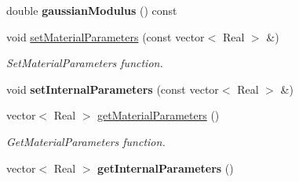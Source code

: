 \begin{DoxyCompactItemize}
\item 
\hypertarget{classvoom_1_1_s_c_elastic_a2ebdf0f150e975475e34781ee908c438}{
double {\bfseries gaussianModulus} () const }
\label{classvoom_1_1_s_c_elastic_a2ebdf0f150e975475e34781ee908c438}

\item 
\hypertarget{classvoom_1_1_s_c_elastic_a1e6bc7f6e0e7bd175e1721abd87e78cc}{
void \hyperlink{classvoom_1_1_s_c_elastic_a1e6bc7f6e0e7bd175e1721abd87e78cc}{setMaterialParameters} (const vector$<$ Real $>$ \&)}
\label{classvoom_1_1_s_c_elastic_a1e6bc7f6e0e7bd175e1721abd87e78cc}

\begin{DoxyCompactList}\small\item\em SetMaterialParameters function. \item\end{DoxyCompactList}\item 
\hypertarget{classvoom_1_1_s_c_elastic_a7c3bf1d771e4242f54622902312be09e}{
void {\bfseries setInternalParameters} (const vector$<$ Real $>$ \&)}
\label{classvoom_1_1_s_c_elastic_a7c3bf1d771e4242f54622902312be09e}

\item 
\hypertarget{classvoom_1_1_s_c_elastic_a2d6dcfee664162af7ae034f7c2e5605b}{
vector$<$ Real $>$ \hyperlink{classvoom_1_1_s_c_elastic_a2d6dcfee664162af7ae034f7c2e5605b}{getMaterialParameters} ()}
\label{classvoom_1_1_s_c_elastic_a2d6dcfee664162af7ae034f7c2e5605b}

\begin{DoxyCompactList}\small\item\em GetMaterialParameters function. \item\end{DoxyCompactList}\item 
\hypertarget{classvoom_1_1_s_c_elastic_a7bafe4bd91ba6ec2236bdfb437086177}{
vector$<$ Real $>$ {\bfseries getInternalParameters} ()}
\label{classvoom_1_1_s_c_elastic_a7bafe4bd91ba6ec2236bdfb437086177}

\end{DoxyCompactItemize}

